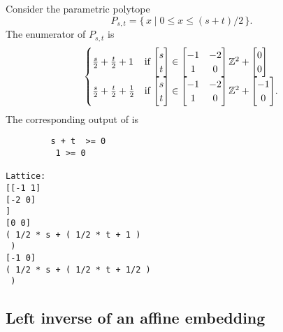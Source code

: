 \begin{example}
Consider the parametric polytope
$$
P_{s,t}=\{\, x \mid 0 \le x \le (s+t)/2 \,\}
.
$$
The enumerator of $P_{s,t}$ is
$$
\begin{cases}
\frac s 2 + \frac t 2 + 1 &
\text{if $\begin{bmatrix}s \\ t \end{bmatrix} \in
\begin{bmatrix}
-1 & -2 \\ 1 & 0
\end{bmatrix}
\mathbb{Z}^2 +
\begin{bmatrix}
0 \\ 0
\end{bmatrix}
$}
\\
\frac s 2 + \frac t 2 + \frac 1 2 &
\text{if $\begin{bmatrix}s \\ t \end{bmatrix} \in
\begin{bmatrix}
-1 & -2 \\ 1 & 0
\end{bmatrix}
\mathbb{Z}^2 +
\begin{bmatrix}
-1 \\ 0
\end{bmatrix}
$}
.
\end{cases}
$$
The corresponding output of  is
\begin{verbatim}
         s + t  >= 0
          1 >= 0

Lattice:
[[-1 1]
[-2 0]
]
[0 0]
( 1/2 * s + ( 1/2 * t + 1 )
 )
[-1 0]
( 1/2 * s + ( 1/2 * t + 1/2 )
 )
\end{verbatim}
\end{example}

\subsection{Left inverse of an affine embedding}
\label{s:inverse}

